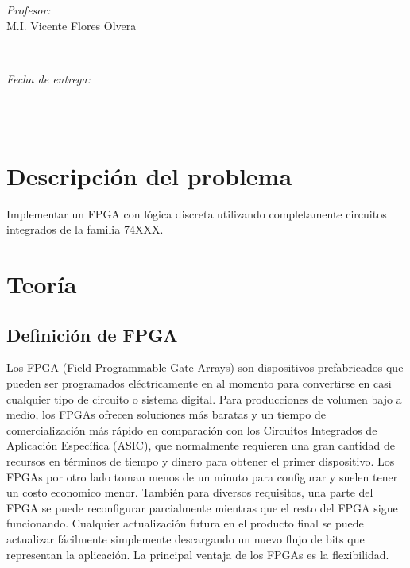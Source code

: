 \documentclass[12pt]{article}
\makeatletter
\let\thedate\@date
\makeatother
\begin{document}
\begin{titlepage}
    \begin{minipage}{0.4\textwidth}
        \begin{flushleft} \large
            \emph{Profesor:}\\
            M.I. Vicente Flores Olvera
        \end{flushleft}
    \end{minipage}~
    \begin{minipage}{0.4\textwidth}
        \begin{flushright} \large
            \emph{Fecha de entrega:}\\
            {\large \thedate}\\[2 cm]
        \end{flushright}
    \end{minipage}\\[2 cm]
    
    
 
    \vfill
    
\end{titlepage}


\tableofcontents
\pagebreak


\section{Descripción del problema}

Implementar un FPGA con lógica  discreta utilizando completamente circuitos integrados de la familia 74XXX.

\section{Teoría}

\subsection{Definición de FPGA}
Los FPGA (Field Programmable Gate Arrays) son dispositivos prefabricados que pueden ser programados eléctricamente en al momento para convertirse en casi cualquier tipo de circuito o sistema digital. Para producciones de volumen bajo a medio, los FPGAs ofrecen soluciones más baratas y un tiempo de comercialización más rápido en comparación con los Circuitos Integrados de Aplicación Específica (ASIC), que normalmente requieren una gran cantidad de recursos en términos de tiempo y dinero para obtener el primer dispositivo. Los FPGAs por otro lado toman menos de un minuto para configurar y suelen tener un costo economico menor. También para diversos requisitos, una parte del FPGA se puede reconfigurar parcialmente mientras que el resto del FPGA sigue funcionando. Cualquier actualización futura en el producto final se puede actualizar fácilmente simplemente descargando un nuevo flujo de bits que representan la aplicación. La principal ventaja de los FPGAs es la flexibilidad.
\end{document}
